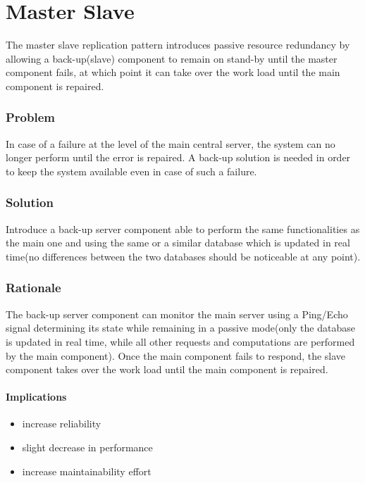
\section{Master Slave}

	The master slave replication pattern introduces passive resource redundancy by allowing a back-up(slave) component to remain on stand-by until the master component fails, at which point it can take over the work load until the main component is repaired.

	\subsubsection{Problem}

		In case of a failure at the level of the main central server, the system can no longer perform until the error is repaired. A back-up solution is needed in order to keep the system available even in case of such a failure.

	\subsubsection{Solution} 

		Introduce a back-up server component able to perform the same functionalities as the main one and using the same or a similar database which is updated in real time(no differences between the two databases should be noticeable at any point).
		
	\subsubsection{Rationale}
	
	The back-up server component can monitor the main server using a Ping/Echo signal determining its state while remaining in a passive mode(only the database is updated in real time, while all other requests and computations are performed by the main component). Once the main component fails to respond, the slave component takes over the work load until the main component is repaired.
	


\paragraph{Implications}
\begin{itemize}
	\item increase reliability
	\item slight decrease in performance
	\item increase maintainability effort
	
\end{itemize}
